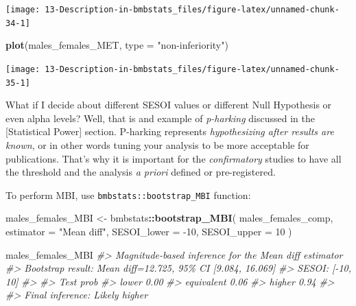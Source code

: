 \documentclass[
]{book}
\newenvironment{Shaded}{\begin{snugshade}}{\end{snugshade}}
\newcommand{\CommentTok}[1]{\textcolor[rgb]{0.56,0.35,0.01}{\textit{#1}}}
\newcommand{\DataTypeTok}[1]{\textcolor[rgb]{0.13,0.29,0.53}{#1}}
\newcommand{\DecValTok}[1]{\textcolor[rgb]{0.00,0.00,0.81}{#1}}
\newcommand{\KeywordTok}[1]{\textcolor[rgb]{0.13,0.29,0.53}{\textbf{#1}}}
\newcommand{\NormalTok}[1]{#1}
\newcommand{\OperatorTok}[1]{\textcolor[rgb]{0.81,0.36,0.00}{\textbf{#1}}}
\newcommand{\StringTok}[1]{\textcolor[rgb]{0.31,0.60,0.02}{#1}}
\begin{document}
\begin{center}\texttt{[image: 13-Description-in-bmbstats\_files/figure-latex/unnamed-chunk-34-1]} \end{center}

\begin{Shaded}
\begin{Highlighting}[]
\KeywordTok{plot}\NormalTok{(males\_females\_MET, }\DataTypeTok{type =} \StringTok{"non{-}inferiority"}\NormalTok{)}
\end{Highlighting}
\end{Shaded}

\begin{center}\texttt{[image: 13-Description-in-bmbstats\_files/figure-latex/unnamed-chunk-35-1]} \end{center}

What if I decide about different SESOI values or different Null Hypothesis or even alpha levels? Well, that is and example of \emph{p-harking} discussed in the {[}Statistical Power{]} section. P-harking represents \emph{hypothesizing after results are known}, or in other words tuning your analysis to be more acceptable for publications. That's why it is important for the \emph{confirmatory} studies to have all the threshold and the analysis \emph{a priori} defined or pre-registered.

To perform MBI, use \texttt{bmbstats::bootstrap\_MBI} function:

\begin{Shaded}
\begin{Highlighting}[]
\NormalTok{males\_females\_MBI <{-}}\StringTok{ }\NormalTok{bmbstats}\OperatorTok{::}\KeywordTok{bootstrap\_MBI}\NormalTok{(}
\NormalTok{  males\_females\_comp,}
  \DataTypeTok{estimator =} \StringTok{"Mean diff"}\NormalTok{,}
  \DataTypeTok{SESOI\_lower =} \DecValTok{{-}10}\NormalTok{,}
  \DataTypeTok{SESOI\_upper =} \DecValTok{10}
\NormalTok{)}

\NormalTok{males\_females\_MBI}
\CommentTok{\#> Magnitude{-}based inference for the \textasciigrave{}Mean diff\textasciigrave{} estimator}
\CommentTok{\#> Bootstrap result: Mean diff=12.725, 95\% CI [9.084, 16.069]}
\CommentTok{\#> SESOI: [{-}10, 10]}
\CommentTok{\#> }
\CommentTok{\#>        Test prob}
\CommentTok{\#>       lower 0.00}
\CommentTok{\#>  equivalent 0.06}
\CommentTok{\#>      higher 0.94}
\CommentTok{\#> }
\CommentTok{\#> Final inference: Likely higher}
\end{Highlighting}
\end{Shaded}
\end{document}
